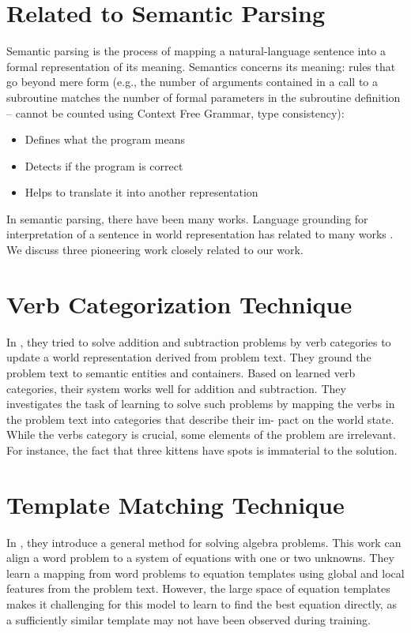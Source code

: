 \documentclass[document.tex]{subfiles}
\begin{document}
\section{Related to Semantic Parsing}
\noindent Semantic parsing is the process of mapping a natural-language sentence into a formal representation of its meaning. Semantics concerns its meaning: rules that go beyond mere
form (e.g., the number of arguments contained in a call to a
subroutine matches the number of formal parameters in the
subroutine definition – cannot be counted using Context Free Grammar, type
consistency):
\begin{itemize}
	\item Defines what the program means
	\item Detects if the program is correct
	\item Helps to translate it into another representation
\end{itemize}
In semantic parsing, there have been many works. Language grounding for interpretation of a sentence in world representation has related to many works \cite{13, 14, 15, 16, 17, 18, 19, 20, 21, 22, 23}. We discuss three pioneering work closely related to our work.
\section{Verb Categorization Technique}
\noindent In \cite{1}, they tried to solve addition and subtraction problems by verb categories to update a world representation derived from problem text. They ground the problem text to semantic entities and containers. Based on learned verb categories, their system works well for addition and subtraction.
They investigates the task of learning to
solve such problems by mapping the verbs in the
problem text into categories that describe their im-
pact on the world state. While the verbs category
is crucial, some elements of the
problem are irrelevant. For instance, the fact that
three kittens have spots is immaterial to the solution. 
\section{Template Matching Technique}
\noindent In \cite{2}, they introduce a general method for solving algebra problems. This work can align a word problem to a system of equations with one or two unknowns. They learn a mapping from word problems to equation templates using global and local features from the problem text. However, the
large space of equation templates makes it challenging for this model to learn to find the best equation
directly, as a sufficiently similar template may not
have been observed during training.
\end{document}
